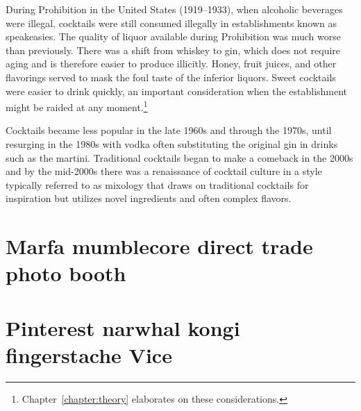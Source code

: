 During Prohibition in the United States (1919--1933), when alcoholic beverages were illegal, cocktails were still consumed illegally in establishments known as speakeasies. The quality of liquor available during Prohibition was much worse than previously. There was a shift from whiskey to gin, which does not require aging and is therefore easier to produce illicitly. Honey, fruit juices, and other flavorings served to mask the foul taste of the inferior liquors. Sweet cocktails were easier to drink quickly, an important consideration when the establishment might be raided at any moment.\footnote{Chapter~\ref{chapter:theory} elaborates on these considerations.}

Cocktails became less popular in the late 1960s and through the 1970s, until resurging in the 1980s with vodka often substituting the original gin in drinks such as the martini. Traditional cocktails began to make a comeback in the 2000s and by the mid-2000s there was a renaissance of cocktail culture in a style typically referred to as mixology that draws on traditional cocktails for inspiration but utilizes novel ingredients and often complex flavors.

\section{Marfa mumblecore direct trade photo booth}

\kant[8-12]

\section{Pinterest narwhal kongi fingerstache Vice}

\kant[25-28]

